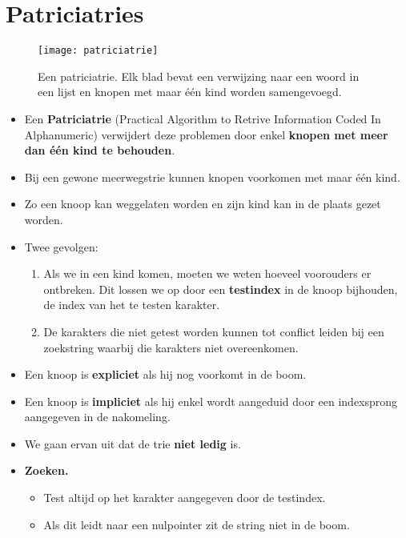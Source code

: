 \section{Patriciatries}
\begin{figure}[ht]
    \centering
    \texttt{[image: patriciatrie]}
    \caption{Een patriciatrie. Elk blad bevat een verwijzing naar een woord in een lijst en knopen met maar één kind worden samengevoegd.}
    \label{fig:patriciatrie}
\end{figure}
\begin{itemize}
    \alert Veel trieknopen hebben maar één kind zodat er veel ongebruikt geheugen is.
    \alert Er zijn ook twee soorten knoopen: inwendige knoop zonder sleutel maar met wijzers naar kinderen, en bladeren met sleutel maar zonder wijzers naar kinderen.
    \item Een \textbf{Patriciatrie} (Practical Algorithm to Retrive Information Coded In Alphanumeric) verwijdert deze problemen door enkel \textbf{knopen met meer dan één kind te behouden}.
    \item Bij een gewone meerwegstrie kunnen knopen voorkomen met maar één kind.
    \item Zo een knoop kan weggelaten worden en zijn kind kan in de plaats gezet worden.
    \item Twee gevolgen:
    \begin{enumerate}
        \item Als we in een kind komen, moeten we weten hoeveel voorouders er ontbreken. Dit lossen we op door een \textbf{testindex} in de knoop bijhouden, de index van het te testen karakter.
        \item De karakters die niet getest worden kunnen tot conflict leiden bij een zoekstring waarbij die karakters niet overeenkomen.
    \end{enumerate}
    \item Een knoop is \textbf{expliciet} als hij nog voorkomt in de boom.
    \item Een knoop is \textbf{impliciet} als hij enkel wordt aangeduid door een indexsprong aangegeven in de nakomeling.
    \item We gaan ervan uit dat de trie \textbf{niet ledig} is.
    \item \textbf{Zoeken.}
    \begin{itemize}
        \item Test altijd op het karakter aangegeven door de testindex.
        \item Als dit leidt naar een nulpointer zit de string niet in de boom.

\end{itemize}
\end{itemize}
